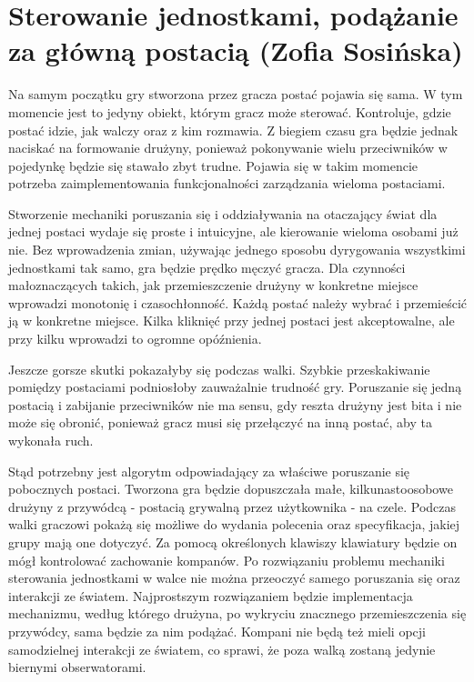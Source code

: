 \section{Sterowanie jednostkami, podążanie za główną postacią (Zofia Sosińska)}\label{chap:sjpzgp}
Na samym początku gry stworzona przez gracza postać pojawia się sama. W tym momencie jest to jedyny obiekt, którym gracz może sterować.
Kontroluje, gdzie postać idzie, jak walczy oraz z kim rozmawia. Z biegiem czasu gra będzie jednak naciskać na formowanie drużyny,
ponieważ pokonywanie wielu przeciwników w pojedynkę będzie się stawało zbyt trudne. Pojawia się w takim momencie potrzeba 
zaimplementowania funkcjonalności zarządzania wieloma postaciami.

Stworzenie mechaniki poruszania się i oddziaływania na otaczający świat dla jednej postaci wydaje się proste i intuicyjne, ale kierowanie wieloma osobami już nie. 
Bez wprowadzenia zmian, używając jednego sposobu dyrygowania wszystkimi jednostkami tak samo, gra będzie prędko męczyć gracza.
Dla czynności małoznaczących takich, jak przemieszczenie drużyny w konkretne miejsce wprowadzi monotonię i czasochłonność.
Każdą postać należy wybrać i przemieścić ją w konkretne miejsce. Kilka kliknięć przy jednej postaci jest akceptowalne, ale przy kilku wprowadzi to ogromne opóźnienia.

Jeszcze gorsze skutki pokazałyby się podczas walki. Szybkie przeskakiwanie pomiędzy postaciami podniosłoby zauważalnie trudność gry.
Poruszanie się jedną postacią i zabijanie przeciwników nie ma sensu, gdy reszta drużyny jest bita i nie może się obronić, ponieważ gracz musi się przełączyć na inną postać,
aby ta wykonała ruch. 

Stąd potrzebny jest algorytm odpowiadający za właściwe poruszanie się pobocznych postaci.
Tworzona gra będzie dopuszczała małe, kilkunastoosobowe drużyny z przywódcą - postacią grywalną przez użytkownika - na czele.
Podczas walki graczowi pokażą się możliwe do wydania polecenia oraz specyfikacja, jakiej grupy mają one dotyczyć.
Za pomocą określonych klawiszy klawiatury będzie on mógł kontrolować zachowanie kompanów.
Po rozwiązaniu problemu mechaniki sterowania jednostkami w walce nie można przeoczyć samego poruszania się oraz interakcji ze światem.
Najprostszym rozwiązaniem będzie implementacja mechanizmu, według którego drużyna, po wykryciu znacznego przemieszczenia się przywódcy, sama będzie za nim podążać.
Kompani nie będą też mieli opcji samodzielnej interakcji ze światem, co sprawi, że poza walką zostaną jedynie biernymi obserwatorami.